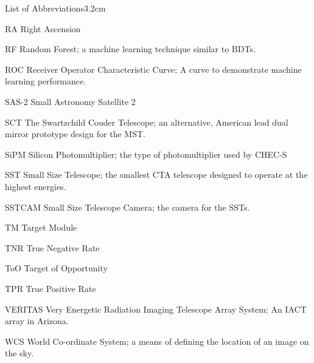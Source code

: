 \begin{mclistof}{List of Abbreviations}{3.2cm}
\item[RA] Right Ascension
\item[RF] Random Forest; a machine learning technique similar to BDTs.
\item[ROC] Receiver Operator Characteristic Curve; A curve to demonstrate machine learning performance. 
\item[SAS-2] Small Astronomy Satellite 2
\item[SCT] The Swartzchild Couder Telescope; an alternative, American lead dual mirror prototype design for the MST.
\item[SiPM] Silicon Photomultiplier; the type of photomultiplier used by CHEC-S
\item[SST] Small Size Telescope; the smallest CTA telescope designed to operate at the highest energies.
\item[SSTCAM] Small Size Telescope Camera; the camera for the SSTs.
\item[TM] Target Module
\item[TNR] True Negative Rate
\item[ToO] Target of Opportunity
\item[TPR] True Positive Rate
\item[VERITAS] Very Energetic Radiation Imaging Telescope Array System; An IACT array in Arizona.
\item[WCS] World Co-ordinate System; a means of defining the location of an image on the sky.
\end{mclistof} 
